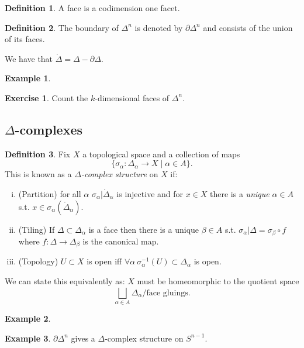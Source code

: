 \documentclass[12pt]{article}
\theoremstyle{definition}
\theoremstyle{definition}
\newtheorem*{defn}{Definition}
\newtheorem*{ex}{Example}
\newtheorem*{exer}{Exercise}
\begin{document}
\begin{defn}
A face is a codimension one facet.
\end{defn}

\begin{defn}
The boundary of $\Delta^n$ is denoted by $\partial \Delta^n$ and consists of the union of its faces.
\end{defn}

We have that $\mathring{\Delta} =\Delta - \partial \Delta$.

\begin{ex}
\end{ex}

\begin{exer}
Count the $k$-dimensional faces of $\Delta^n$.
\end{exer}

\subsection{$\Delta$-complexes}
\begin{defn}
Fix $X$ a topological space and a collection of maps
\[\{\sigma_\alpha \colon \Delta_\alpha \to X \mid \alpha \in A\}.\]
This is known as a \emph{$\Delta$-complex structure} on $X$ if:
\begin{enumerate}[(i)]
\item (Partition) for all $\alpha$ $\sigma_\alpha|\mathring{\Delta}_\alpha$ is injective and for $x\in X$ there is a \emph{unique} $\alpha\in A$ s.t. $x\in\sigma_\alpha(\mathring{\Delta}_\alpha)$.
\item (Tiling) If $\Delta\subset \Delta_\alpha$ is a face then there is a unique $\beta\in A$ s.t. $\sigma_\alpha|\Delta = \sigma_\beta\circ f$ where $f \colon \Delta \to \Delta_\beta$ is the canonical map.
\item (Topology) $U\subset X$ is open iff $\forall \alpha\ \sigma^{-1}_\alpha (U) \subset \Delta_\alpha$ is open.
\end{enumerate}
\end{defn}

We can state this equivalently as: $X$ must be homeomorphic to the quotient space
\[\bigsqcup_{\alpha\in A} \Delta_\alpha / \text{face gluings}.\]

\begin{ex}
\end{ex}

\begin{ex}
$\partial \Delta^n$ gives a $\Delta$-complex structure on $S^{n-1}$.
\end{ex}
\end{document}
